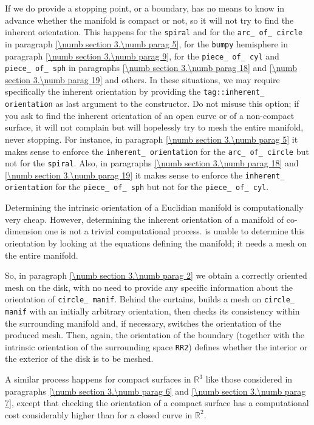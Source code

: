 If we do provide a stopping point, or a boundary, {\maniFEM} has no means to know in
advance whether the manifold
is compact or not, so it will not try to find the inherent orientation.
This happens for the {\small\tt spiral} and for the {\small\tt arc\_\,of\_\,circle} in paragraph
\ref{\numb section 3.\numb parag 5}, for the {\small\tt bumpy} hemisphere in paragraph
\ref{\numb section 3.\numb parag 9}, for the {\small\tt piece\_\,of\_\,cyl} and
{\small\tt piece\_\,of\_\,sph} in paragraphs \ref{\numb section 3.\numb parag 18} and
\ref{\numb section 3.\numb parag 19} and others.
In these situations, we may require specifically the inherent orientation
by providing the {\small\tt \textcolor{tag}{tag}::inherent\_\,orientation} as last argument to the
{\small\tt {}} constructor.
Do not misuse this option; if you ask {\maniFEM} to find the inherent orientation of an open
curve or of a non-compact surface, it will not complain but will hopelessly try to mesh
the entire manifold, never stopping.
For instance, in paragraph \ref{\numb section 3.\numb parag 5} it makes sense to enforce the
{\small\tt inherent\_\,orientation} for the {\small\tt arc\_\,of\_\,circle} but not for the
{\small\tt spiral}.
Also, in paragraphs \ref{\numb section 3.\numb parag 18} and
\ref{\numb section 3.\numb parag 19} it makes sense to enforce the
{\small\tt inherent\_\,orientation} for the
{\small\tt piece\_\,of\_\,sph} but not for the {\small\tt piece\_\,of\_\,cyl}.

Determining the intrinsic orientation of a Euclidian manifold is computationally
very cheap.
However, determining the inherent orientation of a manifold of co-dimension one is not
a trivial computational process.
{\ManiFEM} is unable to determine this orientation by looking at the equations defining
the manifold; it needs a mesh on the entire manifold.

So, in paragraph \ref{\numb section 3.\numb parag 2} we obtain a correctly oriented mesh
on the disk, with no need to provide any specific information about the orientation of
{\small\tt circle\_\,manif}.
Behind the curtains, {\maniFEM} builds a mesh on {\small\tt circle\_\,manif} with
an initially arbitrary orientation, then checks its consistency
within the surrounding manifold and, if necessary, switches the orientation of the produced mesh.
Then, again, the orientation of the boundary (together with the intrinsic orientation of
the surrounding space {\small\tt RR2}) defines whether the interior or the exterior of the
disk is to be meshed.

A similar process happens for compact surfaces in $ \mathbb{R}^3 $ like those
considered in paragraphs \ref{\numb section 3.\numb parag 6} and
\ref{\numb section 3.\numb parag 7},
except that checking the orientation of a compact surface has a computational cost
considerably higher than for a closed curve in $ \mathbb{R}^2 $.

